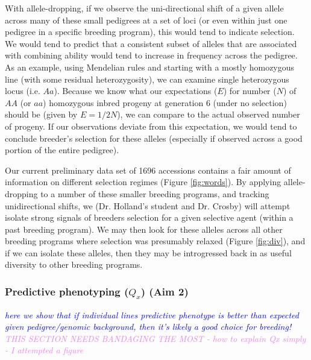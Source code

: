 \documentclass[12pt]{article}
\newcommand{\jri}[1]{\textcolor{blue}{ \emph{\scriptsize  #1}} }
\newcommand{\kc}[1]{\textcolor{violet}{ \emph{\scriptsize  #1}} }
\begin{document}
With allele-dropping, if we observe the uni-directional shift of a given allele across many of these small pedigrees at a set of loci (or even within just one pedigree in a specific breeding program), this would tend to indicate selection. 
We would tend to predict that a consistent subset of alleles that are associated with combining ability would tend to increase in frequency across the pedigree.
As an example, using Mendelian rules and starting with a mostly homozygous line (with some residual heterozygosity), we can examine single heterozygous locus (i.e. $Aa$). 
Because we know what our expectations ($E$) for number ($N$) of $AA$ (or $aa$) homozygous inbred progeny at generation 6 (under no selection) should be (given by $E = 1/2 N$), we can compare to the actual observed number of progeny. 
If our observations deviate from this expectation, we would tend to conclude breeder's selection for these alleles (especially if observed across a good portion of the entire pedigree). 


Our current preliminary data set of 1696 accessions contains a fair amount of information on different selection regimes (Figure \ref{fig:words}). 
By applying allele-dropping to a number of these smaller breeding programs, and tracking unidirectional shifts, we (Dr. Holland's student and Dr. Crosby) will attempt isolate strong signals of breeders selection for a given selective agent (within a past breeding program). 
We may then look for these alleles across all other breeding programs where selection was presumably relaxed (Figure \ref{fig:div}), and if we can isolate these alleles, then they may be introgressed back in as useful diversity to other breeding programs.

\subsubsection*{Predictive phenotyping ($Q_{x}$) (Aim 2)}
\jri{here we show that if individual lines predictive phenotype is better than expected given pedigree/genomic background, then it's likely a good choice for breeding! }
\kc{THIS SECTION NEEDS BANDAGING THE MOST - how to explain Qx simply - I attempted a figure}
\end{document}
